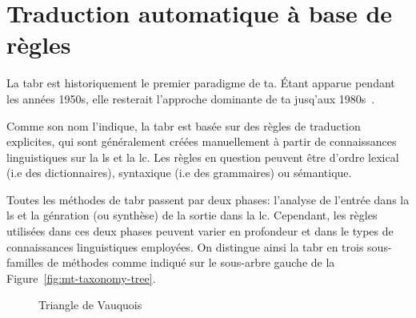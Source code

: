 \section{Traduction automatique à base de règles}
\label{sec:rbmt}

La \acrfull{tabr} est historiquement le premier paradigme de \acrshort{ta}. 
Étant apparue pendant les années 1950s, 
elle resterait l'approche dominante de \acrshort{ta} jusq'aux 1980s~\cite{routledge}.

Comme son nom l'indique, la \acrshort{tabr} est basée sur des règles de traduction explicites,
qui sont généralement créées manuellement à partir de connaissances linguistiques sur la \acrfull{ls} et la \acrfull{lc}. 
Les règles en question peuvent être d'ordre lexical (i.e des dictionnaires),
syntaxique (i.e des grammaires) ou sémantique.

Toutes les méthodes de \acrshort{tabr} passent par deux phases: 
l'analyse de l'entrée dans la \acrshort{ls} 
et la génration (ou synthèse) de la sortie dans la \acrshort{lc}. 
Cependant, les règles utilisées dans ces deux phases peuvent varier en profondeur
et dans le types de connaissances linguistiques employées. 
On distingue ainsi la \acrshort{tabr} en trois sous-familles de méthodes comme indiqué 
sur le sous-arbre gauche de la Figure~\ref{fig:mt-taxonomy-tree}.

\begin{figure}[h]
    \begin{center}
        
    \end{center}
    \caption{Triangle de Vauquois}
    \label{fig:vauquois-triangle}
\end{figure}


